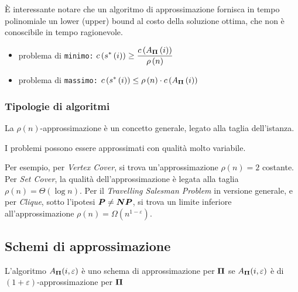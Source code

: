 È interessante notare che un algoritmo di approssimazione fornisca in tempo polinomiale un lower (upper) bound al costo della soluzione ottima, che non è conoscibile in tempo ragionevole.
\begin{itemize}
    \item problema di \texttt{minimo:} $
        \displaystyle
            c \left( 
                s^* \left( i \right)
            \right)
            \geq
            \frac{
                c \left( 
                    A_{\bm{\Pi}} \left( i \right)
                \right)
            }{
                \rho \left( n \right)
            }
        $
    \item problema di \texttt{massimo:} $
        \displaystyle
            c \left( 
                s^* \left( i \right)
            \right)
        \leq
        \rho \left( n \right)
        \cdot
            c \left( 
                A_{\bm{\Pi}} \left( i \right)
            \right)
        $
\end{itemize}

\subsubsection{Tipologie di algoritmi}

La 
$\rho (n)$-approssimazione
è un concetto generale, legato alla taglia dell'istanza.

I problemi possono essere approssimati con qualità molto variabile.

Per esempio,
per \emph{Vertex Cover}, si trova un'approssimazione $\rho(n) = 2$ costante.
Per \emph{Set Cover}, la qualità dell'approssimazione è legata alla taglia $\rho(n) = \Theta ( \log n )$.
Per il \emph{Travelling Salesman Problem} in versione generale, e per \emph{Clique}, sotto l'ipotesi $\bm{P} \ne \bm{NP}$, si trova un limite inferiore all'approssimazione $\rho(n) = \Omega ( n^{1-\varepsilon} )$.

\subsection{Schemi di approssimazione}

\begin{definition}
    \label{def:schemaapprox}
    L'algoritmo
    $A_{\bm{\Pi}} (i,\varepsilon)$
    è uno schema di approssimazione
    per $\bm{\Pi}$ se
    $A_{\bm{\Pi}} (i,\varepsilon)$
    è di $(1+\varepsilon)$-approssimazione per $\bm{\Pi}$
\end{definition}

